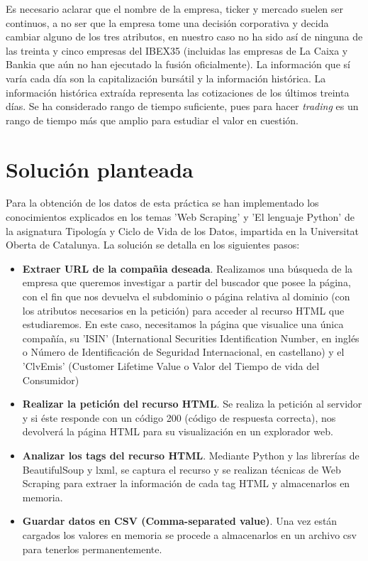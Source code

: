 \documentclass[12pt]{article}
\begin{document}
\begin{itemize}
	Es necesario aclarar que el nombre de la empresa, ticker y mercado suelen ser continuos, a no ser que la empresa tome una decisión corporativa y decida cambiar alguno de los tres atributos, en nuestro caso no ha sido así de ninguna de las treinta y cinco empresas del IBEX35 (incluidas las empresas de La Caixa y Bankia que aún no han ejecutado la fusión oficialmente). La información que sí varía cada día son la capitalización bursátil y la información histórica. La información histórica extraída representa las cotizaciones de los últimos treinta días. Se ha considerado rango de tiempo suficiente, pues para hacer \textit{trading} es un rango de tiempo más que amplio para estudiar el valor en cuestión.
\end{itemize}

\section*{Solución planteada}
Para la obtención de los datos de esta práctica se han implementado los conocimientos explicados en los temas 'Web Scraping' y 'El lenguaje Python' de la asignatura Tipología y Ciclo de Vida de los Datos, impartida en la Universitat Oberta de Catalunya.
La solución se detalla en los siguientes pasos:
\begin{itemize}
	\item \textbf{Extraer URL de la compañia deseada}. Realizamos una búsqueda de la empresa que queremos investigar a partir del buscador que posee la página, con el fin que nos devuelva el subdominio o página relativa al dominio (con los atributos necesarios en la petición) para acceder al recurso HTML que estudiaremos. En este caso, necesitamos la página que visualice una única compañía, su 'ISIN' (International Securities Identification Number, en inglés o Número de Identificación de Seguridad Internacional, en castellano) y el 'ClvEmis' (Customer Lifetime Value o Valor del Tiempo de vida del Consumidor)
	
	\item \textbf{Realizar la petición del recurso HTML}. Se realiza la petición al servidor y si éste responde con un código 200 (código de respuesta correcta), nos devolverá la página HTML para su visualización en un explorador web.
	\item \textbf{Analizar los tags del recurso HTML}. Mediante Python y las librerías de BeautifulSoup y lxml, se captura el recurso y se realizan técnicas de Web Scraping para extraer la información de cada tag HTML y almacenarlos en memoria.
	\item \textbf{Guardar datos en CSV (Comma-separated value)}. Una vez están cargados los valores en memoria se procede a almacenarlos en un archivo csv para tenerlos permanentemente.
\end{itemize}
\end{document}
